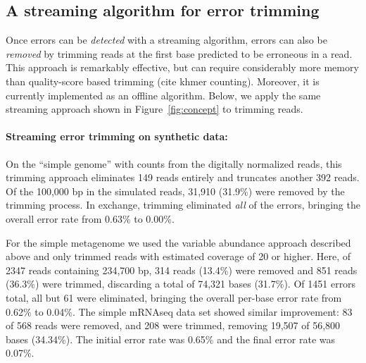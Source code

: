 \documentclass{article}
\begin{document}
\subsection{A streaming algorithm for error trimming}

Once errors can be {\em detected} with a streaming algorithm, errors
can also be {\em removed} by trimming reads at the first base
predicted to be erroneous in a read.  This approach is remarkably
effective, but can require considerably more memory than quality-score
based trimming (cite khmer counting).  Moreover, it is currently
implemented as an offline algorithm.  Below, we apply the same
streaming approach shown in Figure~\ref{fig:concept} to trimming
reads.



\paragraph{Streaming error trimming on synthetic data:}

On the ``simple genome'' with counts from the digitally normalized
reads, this trimming approach eliminates 149 reads entirely and
truncates another 392 reads.  Of the 100,000 bp in the simulated
reads, 31,910 (31.9\%) were removed by the trimming process.  In
exchange, trimming eliminated {\em all} of the errors, bringing the
overall error rate from 0.63\% to 0.00\%.


For the simple metagenome we used the variable abundance approach
described above and only trimmed reads with estimated coverage of 20
or higher.  Here, of 2347 reads containing 234,700 bp, 314 reads
(13.4\%) were removed and 851 reads (36.3\%) were trimmed, discarding
a total of 74,321 bases (31.7\%).  Of 1451 errors total, all but 61
were eliminated, bringing the overall per-base error rate from 0.62\% to
0.04\%.  The simple mRNAseq data set showed similar improvement: 83 of
568 reads were removed, and 208 were trimmed, removing 19,507 of
56,800 bases (34.34\%).  The initial error rate was 0.65\% and the
final error rate was 0.07\%.
\end{document}
